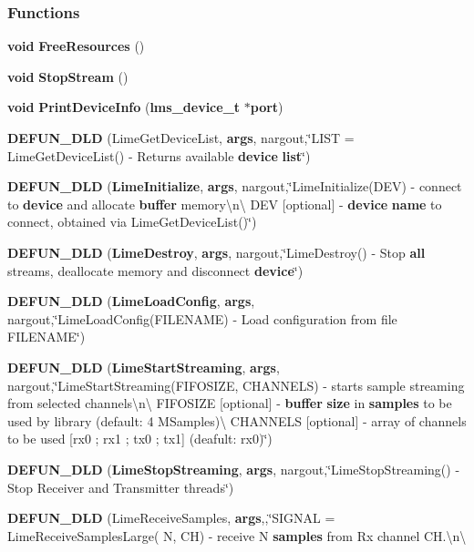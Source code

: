 \subsubsection*{Functions}
\begin{DoxyCompactItemize}
\item 
{\bf void} {\bf Free\+Resources} ()
\item 
{\bf void} {\bf Stop\+Stream} ()
\item 
{\bf void} {\bf Print\+Device\+Info} ({\bf lms\+\_\+device\+\_\+t} $\ast${\bf port})
\item 
{\bf D\+E\+F\+U\+N\+\_\+\+D\+LD} (Lime\+Get\+Device\+List, {\bf args}, nargout,\char`\"{}L\+I\+ST = Lime\+Get\+Device\+List() -\/ Returns available {\bf device} {\bf list}\char`\"{})
\item 
{\bf D\+E\+F\+U\+N\+\_\+\+D\+LD} ({\bf Lime\+Initialize}, {\bf args}, nargout,\char`\"{}Lime\+Initialize(D\+EV) -\/ connect to {\bf device} and allocate {\bf buffer} memory\textbackslash{}n\textbackslash{}
D\+EV [optional] -\/ {\bf device} {\bf name} to connect, obtained via Lime\+Get\+Device\+List()\char`\"{})
\item 
{\bf D\+E\+F\+U\+N\+\_\+\+D\+LD} ({\bf Lime\+Destroy}, {\bf args}, nargout,\char`\"{}Lime\+Destroy() -\/ Stop {\bf all} streams, deallocate memory and disconnect {\bf device}\char`\"{})
\item 
{\bf D\+E\+F\+U\+N\+\_\+\+D\+LD} ({\bf Lime\+Load\+Config}, {\bf args}, nargout,\char`\"{}Lime\+Load\+Config(F\+I\+L\+E\+N\+A\+ME) -\/ Load configuration from file F\+I\+L\+E\+N\+A\+ME\char`\"{})
\item 
{\bf D\+E\+F\+U\+N\+\_\+\+D\+LD} ({\bf Lime\+Start\+Streaming}, {\bf args}, nargout,\char`\"{}Lime\+Start\+Streaming(F\+I\+F\+O\+S\+I\+ZE, C\+H\+A\+N\+N\+E\+LS) -\/ starts sample streaming from selected channels\textbackslash{}n\textbackslash{}
 F\+I\+F\+O\+S\+I\+ZE [optional] -\/ {\bf buffer} {\bf size} in {\bf samples} to be used by library (default\+: 4 M\+Samples)\textbackslash{}
 C\+H\+A\+N\+N\+E\+LS [optional] -\/ array of channels to be used [rx0 ; rx1 ; tx0 ; tx1] (deafult\+: rx0)\char`\"{})
\item 
{\bf D\+E\+F\+U\+N\+\_\+\+D\+LD} ({\bf Lime\+Stop\+Streaming}, {\bf args}, nargout,\char`\"{}Lime\+Stop\+Streaming() -\/ Stop Receiver and Transmitter threads\char`\"{})
\item 
{\bf D\+E\+F\+U\+N\+\_\+\+D\+LD} (Lime\+Receive\+Samples, {\bf args},,\char`\"{}S\+I\+G\+N\+AL = Lime\+Receive\+Samples\+Large( N, CH) -\/ receive N {\bf samples} from Rx channel C\+H.\textbackslash{}n\textbackslash{}

\end{DoxyCompactItemize}
